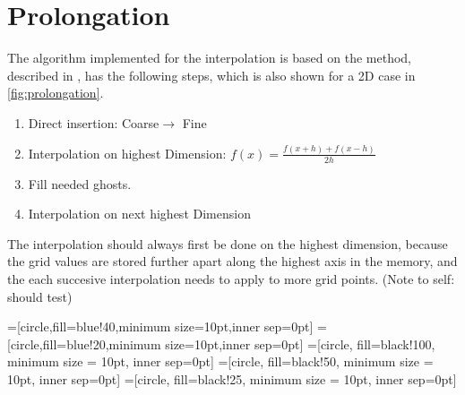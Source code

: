 \section{Prolongation}


	The algorithm implemented for the interpolation is based on the method, described in
	\cite{press_numerical_1988}, has the following steps, which is also shown for a 2D case in \ref{fig:prolongation}.

 	\begin{enumerate}
		\item Direct insertion: Coarse$\rightarrow$ Fine
		\item Interpolation on highest Dimension: \(f(x) = \frac{f(x+h) + f(x-h)}{2h}\)
		\item Fill needed ghosts.
		\item Interpolation on next highest Dimension
	\end{enumerate}

	The interpolation should always first be done on the highest dimension, because the grid values are stored further
	apart along the highest axis in the memory, and the each succesive interpolation needs to apply to more grid points. (Note to self: should test)

	=[circle,fill=blue!40,minimum size=10pt,inner sep=0pt]
	=[circle,fill=blue!20,minimum size=10pt,inner sep=0pt]
	=[circle, fill=black!100, minimum size = 10pt, inner sep=0pt]
	=[circle, fill=black!50, minimum size = 10pt, inner sep=0pt]
	=[circle, fill=black!25, minimum size = 10pt, inner sep=0pt]


